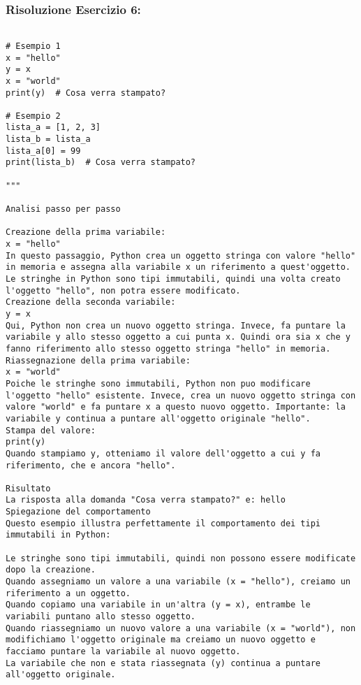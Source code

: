 \vspace{0.3cm}

\subsubsection{Risoluzione Esercizio 6: \textit{}}

\begin{lstlisting}

# Esempio 1
x = "hello"
y = x
x = "world"
print(y)  # Cosa verra stampato?

# Esempio 2
lista_a = [1, 2, 3]
lista_b = lista_a
lista_a[0] = 99
print(lista_b)  # Cosa verra stampato?

"""

Analisi passo per passo

Creazione della prima variabile:
x = "hello"
In questo passaggio, Python crea un oggetto stringa con valore "hello" in memoria e assegna alla variabile x un riferimento a quest'oggetto. Le stringhe in Python sono tipi immutabili, quindi una volta creato l'oggetto "hello", non potra essere modificato.
Creazione della seconda variabile:
y = x
Qui, Python non crea un nuovo oggetto stringa. Invece, fa puntare la variabile y allo stesso oggetto a cui punta x. Quindi ora sia x che y fanno riferimento allo stesso oggetto stringa "hello" in memoria.
Riassegnazione della prima variabile:
x = "world"
Poiche le stringhe sono immutabili, Python non puo modificare l'oggetto "hello" esistente. Invece, crea un nuovo oggetto stringa con valore "world" e fa puntare x a questo nuovo oggetto. Importante: la variabile y continua a puntare all'oggetto originale "hello".
Stampa del valore:
print(y)
Quando stampiamo y, otteniamo il valore dell'oggetto a cui y fa riferimento, che e ancora "hello".

Risultato
La risposta alla domanda "Cosa verra stampato?" e: hello
Spiegazione del comportamento
Questo esempio illustra perfettamente il comportamento dei tipi immutabili in Python:

Le stringhe sono tipi immutabili, quindi non possono essere modificate dopo la creazione.
Quando assegniamo un valore a una variabile (x = "hello"), creiamo un riferimento a un oggetto.
Quando copiamo una variabile in un'altra (y = x), entrambe le variabili puntano allo stesso oggetto.
Quando riassegniamo un nuovo valore a una variabile (x = "world"), non modifichiamo l'oggetto originale ma creiamo un nuovo oggetto e facciamo puntare la variabile al nuovo oggetto.
La variabile che non e stata riassegnata (y) continua a puntare all'oggetto originale.


\end{lstlisting}
